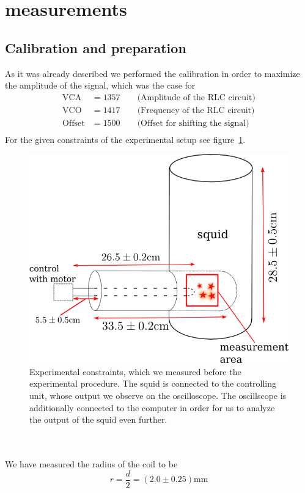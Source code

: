 \section{measurements}
\subsection{Calibration and preparation}
As it was already described we performed the calibration in order to maximize the amplitude of the
signal, which was the case for \\
\begin{align*}
     \mathrm{VCA} &= 1357 \qquad \text{(Amplitude of the RLC circuit)}\\
     \mathrm{VCO} &= 1417 \qquad\text{(Frequency of the RLC circuit)}\\ 
     \mathrm{Offset} &= 1500 \qquad\text{(Offset for shifting the signal)}\\
\end{align*}
For the given constraints of the experimental setup see figure~\ref{fig:setup1}.
\begin{figure}[htpb]
    \centering
    \includegraphics[width=0.8\linewidth]{figures/setup1}
    \caption{Experimental constraints, which we measured before the experimental procedure. The squid
    is connected to the controlling unit, whose output we observe on the oscilloscope. The oscillscope
    is additionally connected to the computer in order for us to analyze the output of the squid even further.}
    \label{fig:setup1}
\end{figure}
\\\\
We have measured the radius of the coil to be 
\begin{equation}
r = \frac{d}{2} = (2.0 \pm 0.25) \mathrm{mm}
\end{equation}

